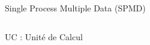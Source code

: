 \documentclass[../main.tex]{subfiles}
\begin{document}
\begin{frame}{Single Process Multiple Data (SPMD)}
  \begin{columns}
    \begin{column}{.5\linewidth}
      {}
      UC : Unité de Calcul
    \end{column}
  \end{columns}
\end{frame}
\end{document}
